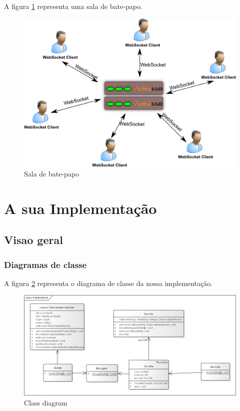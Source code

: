 \documentclass[a4paper,12pt]{article}
\begin{document}
A figura \ref{fig1} representa uma sala de bate-papo.
\begin{figure}[H]
	\centering
	\includegraphics[scale=0.4]{img/454.png}    
	\caption{Sala de bate-papo}
	\label{fig1}     
\end{figure} 

\section{A sua Implementação}
\subsection{Visao geral}
\subsubsection{Diagramas de classe}
A figura \ref{fig2} representa o diagrama de classe da nossa implementação.
\begin{figure}[H]
\includegraphics[scale=0.4]{img/class.png}    
\caption{Class diagram}
\centering
\label{fig2}
\end{figure} 
\end{document}
